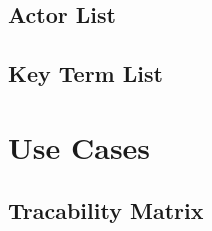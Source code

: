 \documentclass[10pt, draft]{article}
\begin{document}
\subsection{Actor List}

\subsection{Key Term List}

\section{Use Cases}

\subsection*{Tracability Matrix}
\end{document}
